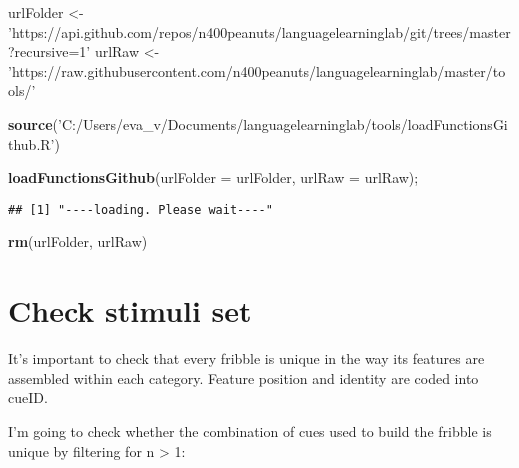 \documentclass[
]{article}
\newenvironment{Shaded}{\begin{snugshade}}{\end{snugshade}}
\newcommand{\DataTypeTok}[1]{\textcolor[rgb]{0.13,0.29,0.53}{#1}}
\newcommand{\DecValTok}[1]{\textcolor[rgb]{0.00,0.00,0.81}{#1}}
\newcommand{\KeywordTok}[1]{\textcolor[rgb]{0.13,0.29,0.53}{\textbf{#1}}}
\newcommand{\NormalTok}[1]{#1}
\newcommand{\OperatorTok}[1]{\textcolor[rgb]{0.81,0.36,0.00}{\textbf{#1}}}
\newcommand{\StringTok}[1]{\textcolor[rgb]{0.31,0.60,0.02}{#1}}
\begin{document}
\begin{Shaded}
\begin{Highlighting}[]
\NormalTok{urlFolder <-}\StringTok{ 'https://api.github.com/repos/n400peanuts/languagelearninglab/git/trees/master?recursive=1'}
\NormalTok{urlRaw <-}\StringTok{ 'https://raw.githubusercontent.com/n400peanuts/languagelearninglab/master/tools/'}

\KeywordTok{source}\NormalTok{(}\StringTok{'C:/Users/eva_v/Documents/languagelearninglab/tools/loadFunctionsGithub.R'}\NormalTok{)}

\KeywordTok{loadFunctionsGithub}\NormalTok{(}\DataTypeTok{urlFolder =}\NormalTok{ urlFolder, }\DataTypeTok{urlRaw =}\NormalTok{ urlRaw);}
\end{Highlighting}
\end{Shaded}

\begin{verbatim}
## [1] "----loading. Please wait----"
\end{verbatim}

\begin{Shaded}
\begin{Highlighting}[]
\KeywordTok{rm}\NormalTok{(urlFolder, urlRaw)}
\end{Highlighting}
\end{Shaded}

\hypertarget{check-stimuli-set}{%
\section{Check stimuli set}\label{check-stimuli-set}}

It's important to check that every fribble is unique in the way its
features are assembled within each category. Feature position and
identity are coded into cueID.

I'm going to check whether the combination of cues used to build the
fribble is unique by filtering for n \textgreater{} 1:

\begin{Shaded}
\end{Shaded}
\end{document}
